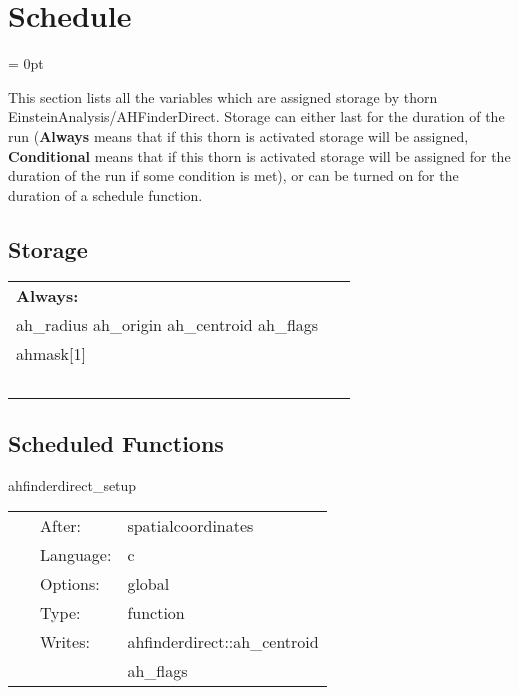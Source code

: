 
\section{Schedule} 


\parskip = 0pt


\noindent This section lists all the variables which are assigned storage by thorn EinsteinAnalysis/AHFinderDirect.  Storage can either last for the duration of the run ({\bf Always} means that if this thorn is activated storage will be assigned, {\bf Conditional} means that if this thorn is activated storage will be assigned for the duration of the run if some condition is met), or can be turned on for the duration of a schedule function.


\subsection*{Storage}

\hspace{5mm}

 \begin{tabular*}{160mm}{ll} 

{\bf Always:}&  ~ \\ 
 ah\_radius ah\_origin ah\_centroid ah\_flags & ~\\ 
 ahmask[1] & ~\\ 
~ & ~\\ 
\end{tabular*} 


\subsection*{Scheduled Functions}
\vspace{5mm}


\hspace{5mm} ahfinderdirect\_setup 

\hspace{5mm}{\it setup data structures } 


\hspace{5mm}

 \begin{tabular*}{160mm}{cll} 
~ & After:  & spatialcoordinates \\ 
~ & Language:  & c \\ 
~ & Options:  & global \\ 
~ & Type:  & function \\ 
~ & Writes:  & ahfinderdirect::ah\_centroid \\ 
~& ~ &ah\_flags\\ 
\end{tabular*} 


